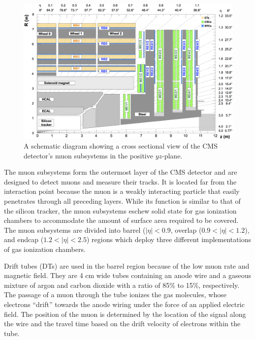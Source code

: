 \begin{figure}[htbp]
  \centering
    \includegraphics[width=5.5in]{images/muon_diagram}
    \caption[Schematic for the CMS Muon Subsystems]{A schematic diagram showing a cross sectional view of the CMS detector's muon subsystems in the positive $yz$-plane.\cite{MUONDIAGRAM}}
    \label{fig:CMSmuondiag}
\end{figure}

The muon subsystems form the outermost layer of the CMS detector and are designed to detect muons and measure their tracks. It is located far from the interaction point because the muon is a weakly interacting particle that easily penetrates through all preceding layers. While its function is similar to that of the silicon tracker, the muon subsystems eschew solid state for gas ionization chambers to accommodate the amount of surface area required to be covered. The muon subsystems are divided into barrel ($\left| \eta \right| < 0.9$, overlap ($0.9 < \left| \eta \right| < 1.2$), and endcap ($1.2 < \left| \eta \right| < 2.5$) regions which deploy three different implementations of gas ionization chambers.

Drift tubes (DTs) are used in the barrel region because of the low muon rate and magnetic field. They are 4 cm wide tubes containing an anode wire and a gaseous mixture of argon and carbon dioxide with a ratio of 85\% to 15\%, respectively. The passage of a muon through the tube ionizes the gas molecules, whose electrons ``drift'' towards the anode wiring under the force of an applied electric field. The position of the muon is determined by the location of the signal along the wire and the travel time based on the drift velocity of electrons within the tube.

